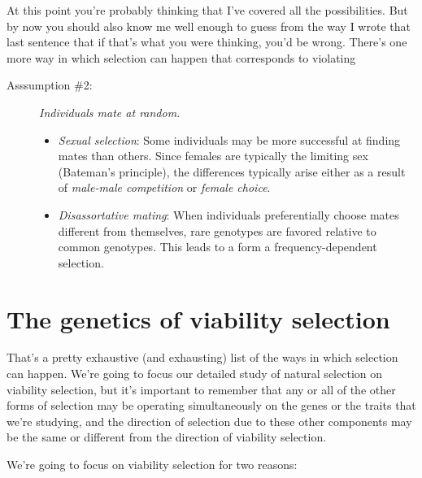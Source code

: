 At this point you're probably thinking that I've covered all the
possibilities. But by now you should also know me well enough to guess
from the way I wrote that last sentence that if that's what you were
thinking, you'd be wrong. There's one more way in which selection can
happen that corresponds to violating

\begin{description}

\item[Asssumption \#2:] {\it Individuals mate at random.}

\begin{itemize}

\item {\it Sexual selection\/}: Some individuals may be more
  successful at finding mates than others. Since females are typically
  the limiting sex (Bateman's principle), the differences typically
  arise either as a result of {\it male-male competition\/} or {\it
    female choice}.

\item {\it Disassortative mating\/}: When individuals preferentially
  choose mates different from themselves, rare genotypes are favored
  relative to common genotypes. This leads to a form a
  frequency-dependent selection.

\end{itemize}

\end{description}

\section*{The genetics of viability selection}

That's a pretty exhaustive (and exhausting) list of the ways in which
selection can happen. We're going to focus our detailed study of
natural selection on viability selection, but it's important to
remember that any or all of the other forms of selection may be
operating simultaneously on the genes or the traits that we're
studying, and the direction of selection due to these other components
may be the same or different from the direction of viability
selection. 

We're going to focus on viability selection for two reasons:

